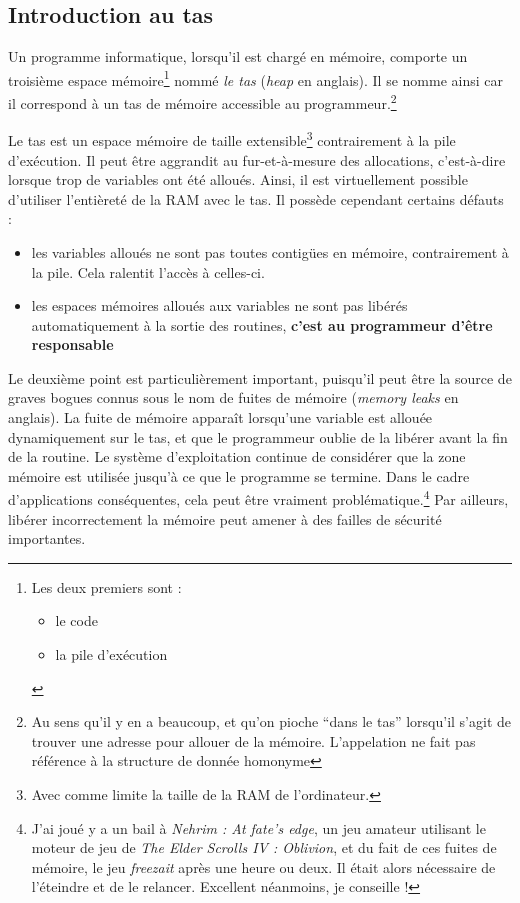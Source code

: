 \documentclass[../../../main.tex]{subfiles}
\begin{document}
\subsection{Introduction au tas}
Un programme informatique, lorsqu'il est chargé en mémoire, comporte un troisième espace mémoire\footnote{Les deux premiers sont :\begin{itemize}
	\item le code
	\item la pile d'exécution
\end{itemize}} nommé \textit{le tas} (\textit{heap} en anglais). Il se nomme ainsi car il correspond à un tas de mémoire accessible au programmeur.\footnote{Au sens qu'il y en a beaucoup, et qu'on pioche ``dans le tas'' lorsqu'il s'agit de trouver une adresse pour allouer de la mémoire. L'appelation ne fait pas référence à la structure de donnée homonyme}
 
Le tas est un espace mémoire de taille extensible\footnote{Avec comme limite la taille de la RAM de l'ordinateur.} contrairement à la pile d'exécution. Il peut être aggrandit au fur-et-à-mesure des allocations, c'est-à-dire lorsque trop de variables ont été alloués. Ainsi, il est virtuellement possible d'utiliser l'entièreté de la RAM avec le tas. Il possède cependant certains défauts :
\begin{itemize}
	\item les variables alloués ne sont pas toutes contigües en mémoire, contrairement à la pile. Cela ralentit l'accès à celles-ci.
	\item les espaces mémoires alloués aux variables ne sont pas libérés automatiquement à la sortie des routines, \textbf{c'est au programmeur d'être responsable}
\end{itemize}
Le deuxième point est particulièrement important, puisqu'il peut être la source de graves bogues connus sous le nom de fuites de mémoire (\textit{memory leaks} en anglais). La fuite de mémoire apparaît lorsqu'une variable est allouée dynamiquement sur le tas, et que le programmeur oublie de la libérer avant la fin de la routine. Le système d'exploitation continue de considérer que la zone mémoire est utilisée jusqu'à ce que le programme se termine. Dans le cadre d'applications conséquentes, cela peut être vraiment problématique.\footnote{J'ai joué y a un bail à \textit{Nehrim : At fate's edge}, un jeu amateur utilisant le moteur de jeu de \textit{The Elder Scrolls IV : Oblivion}, et du fait de ces fuites de mémoire, le jeu \textit{freezait} après une heure ou deux. Il était alors nécessaire de l'éteindre et de le relancer. Excellent néanmoins, je conseille !} Par ailleurs, libérer incorrectement la mémoire peut amener à des failles de sécurité importantes.
 
\end{document}
